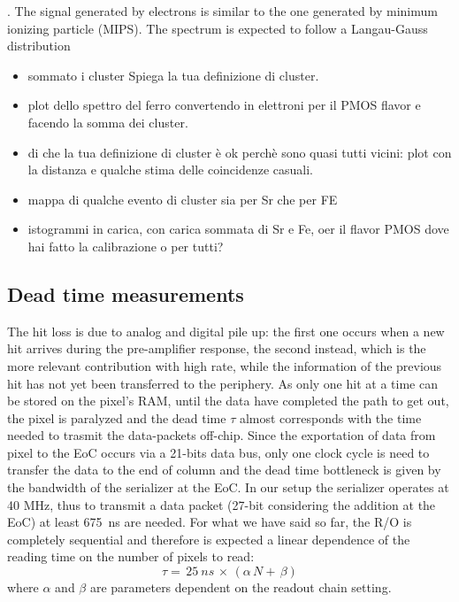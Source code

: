         .
        The signal generated by electrons is similar to the one generated by minimum ionizing particle (MIPS).
        The spectrum is expected to follow a Langau-Gauss distribution

        \begin{itemize}
            \item sommato i cluster Spiega la tua definizione di cluster.
            \item plot dello spettro del ferro convertendo in elettroni per il PMOS flavor e facendo la somma dei cluster. 
            \item di che la tua definizione di cluster è ok perchè sono quasi tutti vicini: plot con la distanza e qualche stima delle coincidenze casuali.
            \item mappa di qualche evento di cluster sia per Sr che per FE
            \item istogrammi in carica, con carica sommata di Sr e Fe, oer il flavor PMOS dove hai fatto la calibrazione o per tutti?
        \end{itemize}


       
   
         
    \subsection{Dead time measurements}
        The hit loss is due to analog and digital pile up: the first one occurs when a new hit arrives during the pre-amplifier response, the second instead, which is the more relevant contribution with high rate, while the information of the previous hit has not yet been transferred to the periphery.  
        As only one hit at a time can be stored on the pixel's RAM, until the data have completed the path to get out, the pixel is paralyzed and the dead time $\tau$ almost corresponds with the time needed to trasmit the data-packets off-chip.
        Since the exportation of data from pixel to the EoC occurs via a 21-bits data bus, only one clock cycle is need to transfer the data to the end of column and the dead time bottleneck is given by the bandwidth of the serializer at the EoC. In our setup the serializer operates at 40 MHz, thus to transmit a data packet (27-bit considering the addition at the EoC) at least \SI{675}{ns} are needed. 
        For what we have said so far, the R/O is completely sequential and therefore is expected a linear dependence of the reading time on the number of pixels to read:
        \begin{equation}
            \tau =\, 25\: \unit{ns}\, \times\, (\alpha\, N +\, \beta)
            \label{eq:reading_time}
        \end{equation}
        where $\alpha$ and $\beta$ are parameters dependent on the readout chain setting. 
        
